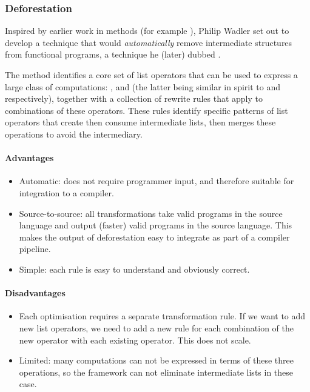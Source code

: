 \subsubsection{Deforestation}

Inspired by earlier work in  methods (for example
\citet{Burstall:1977kl}), Philip Wadler set out to develop a technique that
would \emph{automatically} remove intermediate structures from functional
programs, a technique he (later) dubbed 
\cite{Wadler:1981hy,Wadler:1990ix}.

The method identifies a core set of list operators that can be used to express a
large class of computations: ,  and  (the
latter being similar in spirit to  and  respectively),
together with a collection of rewrite rules that apply to combinations of these
operators. These rules identify specific patterns of list operators that create
then consume intermediate lists, then merges these operations to avoid the
intermediary.

\paragraph{Advantages}
\begin{itemize}
    \item Automatic: does not require programmer input, and therefore suitable
        for integration to a compiler.

    \item Source-to-source: all transformations take valid programs in the
        source language and output (faster) valid programs in the source
        language. This makes the output of deforestation easy to integrate as
        part of a compiler pipeline.

    \item Simple: each rule is easy to understand and obviously correct.
\end{itemize}

\paragraph{Disadvantages}
\begin{itemize}
    \item Each optimisation requires a separate transformation rule. If we want
        to add new list operators, we need to add a new rule for each
        combination of the new operator with each existing operator. This does
        not scale.

    \item Limited: many computations can not be expressed in terms of these
        three operations, so the framework can not eliminate intermediate lists
        in these case.
\end{itemize}


